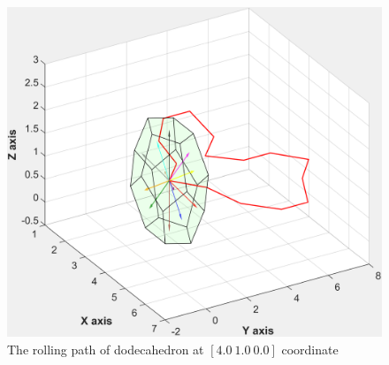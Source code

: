 \begin{figure}[h]
\centering
	\includegraphics[width=\textwidth]{image/dodecaPath1.pdf}
	\caption{The rolling path of dodecahedron at $[4.0\ 1.0\ 0.0]$ coordinate}
	\label{fig:dodecaPath1}
\end{figure}








